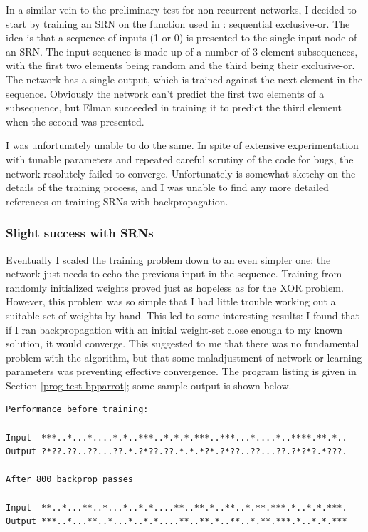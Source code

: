 \documentclass[a4paper]{report}
\begin{document}
\label{res-bp-srn}

In a similar vein to the preliminary test for non-recurrent networks,
I decided to start by training an SRN on the function used in
\cite{elman90}: sequential exclusive-or. The idea is that a sequence
of inputs (1 or 0) is presented to the single input node of an SRN. The
input sequence is made up of a number of 3-element subsequences, with
the first two elements being random and the third being their
exclusive-or. The network has a single output, which is trained
against the next element in the sequence. Obviously the network can't
predict the first two elements of a subsequence, but Elman succeeded
in training it to predict the third element when the second was
presented.

I was unfortunately unable to do the same. In spite of extensive
experimentation with tunable parameters and repeated careful scrutiny
of the code for bugs, the network resolutely failed to
converge. Unfortunately \cite{elman90} is somewhat sketchy on the
details of the training process, and I was unable to find any more
detailed references on training SRNs with backpropagation.

\subsubsection*{Slight success with SRNs}

Eventually I scaled the training problem down to an even simpler one:
the network just needs to echo the previous input in the sequence.
Training from randomly initialized weights proved just as hopeless as
for the XOR problem. However, this problem was so simple that I had
little trouble working out a suitable set of weights by hand. This led
to some interesting results: I found that if I ran backpropagation
with an initial weight-set close enough to my known solution, it would
converge. This suggested to me that there was no fundamental problem
with the algorithm, but that some maladjustment of network or learning
parameters was preventing effective convergence. The program listing
is given in Section \ref{prog-test-bpparrot}; some sample output is
shown below.

\begin{verbatim}
Performance before training:

Input  ***..*...*....*.*..***..*.*.*.***..***...*....*..****.**.*..
Output ?*??.??..??...??.*.?*??.??.*.*.*?*.?*??..??...??.?*?*?.*???.

After 800 backprop passes

Input  **..*...**..*...*..*.*....**..**.*..**..*.**.***.*..*.*.***.
Output ***..*...**..*...*..*.*....**..**.*..**..*.**.***.*..*.*.***
\end{verbatim}
\end{document}
